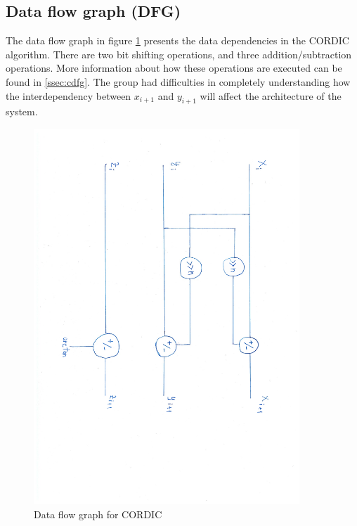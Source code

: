 \documentclass[12pt, a4paper,oneside]{article}
\begin{document}
\subsection{Data flow graph (DFG)}
The data flow graph in figure \ref{fig:cordic_dfg} presents the data dependencies
in the CORDIC algorithm. There are two bit shifting operations, and three
addition/subtraction operations. More information about how these operations
are executed can be found in \ref{ssec:cdfg}. The group had difficulties 
in completely understanding how the interdependency between $x_{i+1}$
and $y_{i+1}$ will affect the architecture of the system.

\begin{figure}[H]
	\centering
    \includegraphics[clip, trim=2cm 7cm 2.2cm 2.5cm, width = 10cm,angle=90]{cordic_dfg.pdf}
	\caption{Data flow graph for CORDIC}
	\label{fig:cordic_dfg}
\end{figure}
\end{document}
